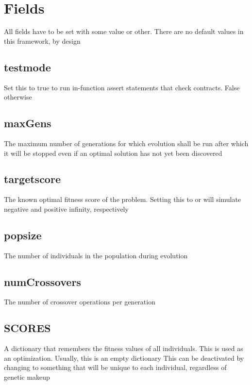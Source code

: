 \documentclass[letterpaper,10pt,english]{sphinxmanual}
\begin{document}
\section{Fields}
\label{settings.py:fields}
All fields have to be set with some value or other. There are no default values in this framework, by design


\subsection{testmode}
\label{settings.py:testmode}
Set this to true to run in-function assert statements that check contracts. False otherwise


\subsection{maxGens}
\label{settings.py:maxgens}
The maximum number of generations for which evolution shall be run after which it will be stopped even if an optimal solution has not yet been discovered


\subsection{targetscore}
\label{settings.py:targetscore}
The known optimal fitness score of the problem. Setting this to  or  will simulate negative and positive infinity, respectively


\subsection{popsize}
\label{settings.py:popsize}
The number of individuals in the population during evolution


\subsection{numCrossovers}
\label{settings.py:numcrossovers}
The number of crossover operations per generation


\subsection{SCORES}
\label{settings.py:scores}
A dictionary that remembers the fitness values of all individuals. This is used as an optimization. Usually, this is an empty dictionary
This can be deactivated by changing  to something that will be unique to each individual, regardless of genetic makeup
\end{document}
